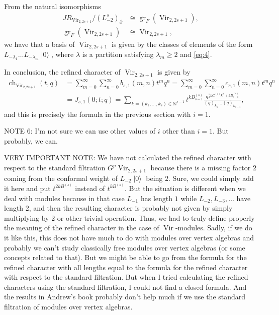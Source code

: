 \documentclass[a4paper, 12pt, reqno]{amsart}
\theoremstyle{remark}
\DeclareMathOperator{\Vir}{Vir}
\DeclareMathOperator{\ch}{ch}
\DeclareMathOperator{\vac}{|0\rangle}
\DeclareMathOperator{\gr}{gr}
\begin{document}
From the natural isomorphisms
\begin{align*}
  JR_{\Vir_{2, 2s + 1}}/(L_{-2}^s)_{\partial} &\cong \gr_F(\Vir_{2, 2s + 1}), \\
  \gr_F(\Vir_{2, 2s + 1}) &\cong \Vir_{2, 2s + 1},
\end{align*}
we have that a basis of $\Vir_{2, 2s + 1}$ is given by the classes of elements of the form $L_{-\lambda_1}\dots L_{-\lambda_m}\vac$, where $\lambda$ is a partition satisfying $\lambda_m \ge 2$ and \eqref{eq:4}.

In conclusion, the refined character of $\Vir_{2, 2s + 1}$ is given by 
\begin{align*}
  \ch_{\Vir_{2, 2s + 1}}(t, q) &= \sum_{m = 0}^{\infty}\sum_{n = 0}^{\infty}b_{s, 1}(m, n)t^mq^n = \sum_{m = 0}^{\infty}\sum_{n = 0}^{\infty}c_{s, 1}(m, n)t^mq^n \\
                               &= J_{s, 1}(0; t; q) = \sum_{k = (k_1, \dots, k_s) \in \mathbb{N}^{s - 1}}t^{kB^{(s)}_{s - 1}}\frac{q^{\frac{1}{2}kG^{(s)}k^T + kB^{(s)}_{s - 1}}}{(q)_{k_1}\dots(q)_{k_{s - 1}}},
\end{align*}
and this is precisely the formula in the previous section with $i = 1$.

NOTE 6: I'm not sure we can use other values of $i$ other than $i = 1$.
But probably, we can.

VERY IMPORTANT NOTE: We have not calculated the refined character with respect to the standard filtration $G^p\Vir_{2, 2s + 1}$ because there is a missing factor $2$ coming from the conformal weight of $L_{-2}\vac$ being $2$.
Sure, we could simply add it here and put $t^{2kB^{(s)}}$ instead of $t^{kB^{(s)}}$.
But the situation is different when we deal with modules because in that case $L_{-1}$ has length $1$ while $L_{-2}, L_{-3}, \dots$ have length $2$, and then the resulting character is probably not given by simply multiplying by $2$ or other trivial operation.
Thus, we had to truly define properly the meaning of the refined character in the case of $\Vir$-modules.
Sadly, if we do it like this, this does not have much to do with modules over vertex algebras and probably we can't study classically free modules over vertex algebras (or some concepts related to that).
But we might be able to go from the formula for the refined character with all lengths equal to the formula for the refined character with respect to the standard filtration.
But when I tried calculating the refined characters using the standard filtration, I could not find a closed formula.
And the results in Andrew's book probably don't help much if we use the standard filtration of modules over vertex algebras.
\end{document}
